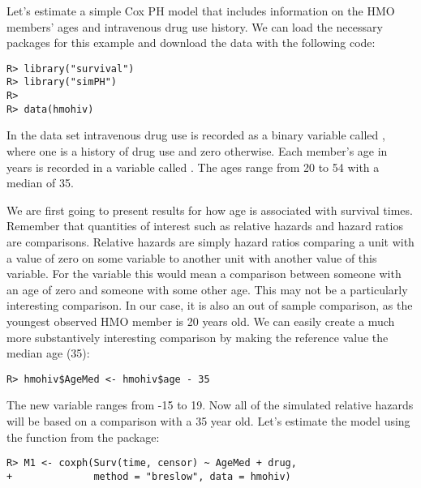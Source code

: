 \documentclass[nojss]{jss}\usepackage[]{graphicx}\usepackage[]{color}
\makeatletter
\newenvironment{kframe}{%
 \def\at@end@of@kframe{}%
 \ifinner\ifhmode%
  \def\at@end@of@kframe{\end{minipage}}%
  \begin{minipage}{\columnwidth}%
 \fi\fi%
 \def\FrameCommand##1{\hskip\@totalleftmargin \hskip-\fboxsep
 \colorbox{shadecolor}{##1}\hskip-\fboxsep
     \hskip-\linewidth \hskip-\@totalleftmargin \hskip\columnwidth}%
 \MakeFramed {\advance\hsize-\width
   \@totalleftmargin\z@ \linewidth\hsize
   \@setminipage}}%
 {\par\unskip\endMakeFramed%
 \at@end@of@kframe}
\newenvironment{knitrout}{}{} %
\makeatother
\begin{document}
Let's estimate a simple Cox PH model that includes information on the HMO members' ages and intravenous drug use history. We can load the necessary packages for this example and download the data with the following code:

\begin{knitrout}
\color{fgcolor}\begin{kframe}
\begin{verbatim}
R> library("survival")
R> library("simPH")
R> 
R> data(hmohiv)
\end{verbatim}
\end{kframe}
\end{knitrout}

In the data set intravenous drug use is recorded as a binary variable called , where one is a history of drug use and zero otherwise. Each member's age in years is recorded in a variable called . The ages range from 20 to 54 with a median of 35.

We are first going to present results for how age is associated with survival times. Remember that quantities of interest such as relative hazards and hazard ratios are comparisons. Relative hazards are simply hazard ratios comparing a unit with a value of zero on some variable to another unit with another value of this variable. For the  variable this would mean a comparison between someone with an age of zero and someone with some other age. This may not be a particularly interesting comparison. In our case, it is also an out of sample comparison, as the youngest observed HMO member is 20 years old. We can easily create a much more substantively interesting comparison by making the reference value the median age (35):

\begin{knitrout}
\color{fgcolor}\begin{kframe}
\begin{verbatim}
R> hmohiv$AgeMed <- hmohiv$age - 35
\end{verbatim}
\end{kframe}
\end{knitrout}

The new variable ranges from -15 to 19. Now all of the simulated relative hazards will be based on a comparison with a 35 year old. Let's estimate the model using the  function from the  package:

\begin{knitrout}
\color{fgcolor}\begin{kframe}
\begin{verbatim}
R> M1 <- coxph(Surv(time, censor) ~ AgeMed + drug,
+              method = "breslow", data = hmohiv)
\end{verbatim}
\end{kframe}
\end{knitrout}
\end{document}
